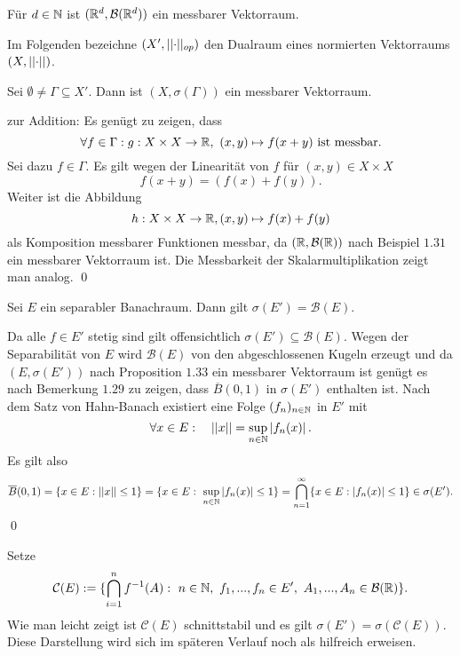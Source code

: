 \begin{example}
    Für $d \in \mathbb{N}$ ist $(\mathbb{R}^d, \mathcal{B}(\mathbb{R}^d))$ ein messbarer Vektorraum. 
\end{example}

Im Folgenden bezeichne $(X', \lvert\lvert \cdot \rvert\rvert_{op})$ den Dualraum eines normierten Vektorraums $(X, \lvert\lvert \cdot \rvert\rvert)$. 

\begin{proposition}
    Sei $\emptyset \neq \Gamma \subseteq X'$. Dann ist $(X, \sigma({\Gamma}))$ ein messbarer Vektorraum. 
\end{proposition}

\begin{proof*}%
    zur Addition: Es genügt zu zeigen, dass 
    $$
        \forall f \in \Gamma : g: X \times X \to \R, \ (x,y) \mapsto f(x+y) \text{ ist messbar.}
    $$
    Sei dazu $f \in \Gamma$. Es gilt wegen der Linearität von $f$ für $(x,y) \in X \times X$
    $$
        f(x + y) = (f(x) + f(y)).
    $$
    Weiter ist die Abbildung 
    $$
        h: X \times X \to \mathbb{R}, (x,y) \mapsto f(x) + f(y)
    $$
    als Komposition messbarer Funktionen messbar, da $(\mathbb{R}, \mathcal{B}(\mathbb{R}))$ nach Beispiel $1.31$ ein messbarer Vektorraum ist. 
    Die Messbarkeit der Skalarmultiplikation zeigt man analog. \qed 
\end{proof*}

\begin{proposition}
    Sei $E$ ein separabler Banachraum. Dann gilt $\sigma(E') = \mathcal{B}(E)$. 
\end{proposition}

\begin{proof*}%
    Da alle $f \in E'$ stetig sind gilt offensichtlich $\sigma(E') \subseteq \mathcal{B}(E)$. 
    Wegen der Separabilität von $E$ wird $\mathcal{B}(E)$ von den abgeschlossenen Kugeln erzeugt und da $(E, \sigma(E'))$ nach Proposition $1.33$ ein messbarer Vektorraum ist genügt es nach Bemerkung $1.29$ zu zeigen, 
    dass $\overline{B}(0,1)$ in $\sigma(E')$ enthalten ist. Nach dem Satz von Hahn-Banach existiert eine Folge $(f_n)_{n \in \mathbb{N}}$ in $E'$ mit
    $$
        \forall x \in E: \quad \lvert\lvert x \rvert\rvert = \sup_{n \in \mathbb{N}}\left| f_n(x) \right|.
    $$
    Es gilt also
    $$
        \overline{B}(0,1) = \{ x \in E: \lvert\lvert x \rvert\rvert \leq 1 \} = \{x \in E: \ \sup_{n \in \mathbb{N}}\left| f_n(x) \right| \leq 1 \} = \bigcap_{n=1}^{\infty}\{x \in E: \left| f_n(x) \right| \leq 1\} \in \sigma(E').
    $$
    \qed 
\end{proof*}

\begin{remark}
    Setze 
    $$
        \mathcal{C}(E) := \{ \bigcap_{i=1}^n f^{-1}(A): \ n \in \N, \ f_1,...,f_n \in E', \ A_1,...,A_n \in \mathcal{B}(\R) \}.
    $$
    Wie man leicht zeigt ist $\mathcal{C}(E)$ schnittstabil und es gilt $\sigma(E') = \sigma(\mathcal{C}(E))$. 
    Diese Darstellung wird sich im späteren Verlauf noch als hilfreich erweisen. 
\end{remark}